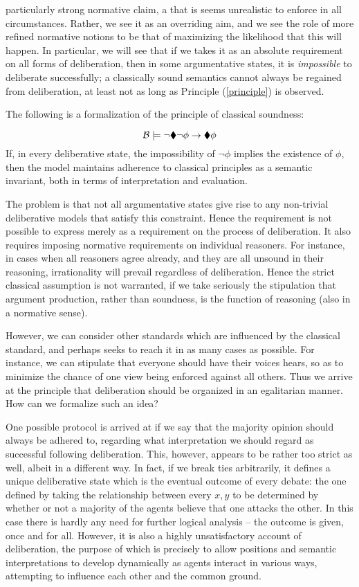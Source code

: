 \documentclass[greybox]{svmult}
\newcommand{\views}{\mathcal B}
\begin{document}
particularly strong normative claim, a that is seems unrealistic to enforce in all circumstances. Rather, we see it as an overriding aim, and we see the role of more refined normative notions to be that of maximizing the likelihood that this will happen. In particular, we will see that if we takes it as an absolute requirement on all forms of deliberation, then in some argumentative states, it is \emph{impossible} to deliberate successfully; a classically sound semantics cannot always be regained from deliberation, at least not as long as Principle (\ref{principle}) is observed.

The following is a formalization of the principle of classical soundness:

$$
\views \models \neg \cdia \neg \phi \to \cdia \phi
$$
If, in every deliberative state, the impossibility of $\neg \phi$ implies the existence of $\phi$, then the model maintains adherence to classical principles as a semantic invariant, both in terms of interpretation and evaluation.

The problem is that not all argumentative states give rise to any non-trivial deliberative models that satisfy this constraint. Hence the requirement is not possible to express merely as a requirement on the process of deliberation. It also requires imposing normative requirements on individual reasoners. For instance, in cases when all reasoners agree already, and they are all unsound in their reasoning, irrationality will prevail regardless of deliberation. Hence the strict classical assumption is not warranted, if we take seriously the stipulation that argument production, rather than soundness, is the function of reasoning (also in a normative sense).

However, we can consider other standards which are influenced by the classical standard, and perhaps seeks to reach it in as many cases as possible. For instance, we can stipulate that everyone should have their voices hears, so as to minimize the chance of one view being enforced against all others. Thus we arrive at the principle that deliberation should be organized in an egalitarian manner. How can we formalize such an idea?

One possible protocol is arrived at if we say that the majority opinion should always be adhered to, regarding what interpretation we should regard as successful following deliberation. This, however, appears to be rather too strict as well, albeit in a different way. In fact, if we break ties arbitrarily, it defines a unique deliberative state which is the eventual outcome of every debate: the one defined by taking the relationship between every $x,y$ to be determined by whether or not a majority of the agents believe that one attacks the other. In this case there is hardly any need for further logical analysis -- the outcome is given, once and for all. However, it is also a highly unsatisfactory account of deliberation, the purpose of which is precisely to allow positions and semantic interpretations to develop dynamically as agents interact in various ways, attempting to influence each other and the common ground. 
\end{document}
